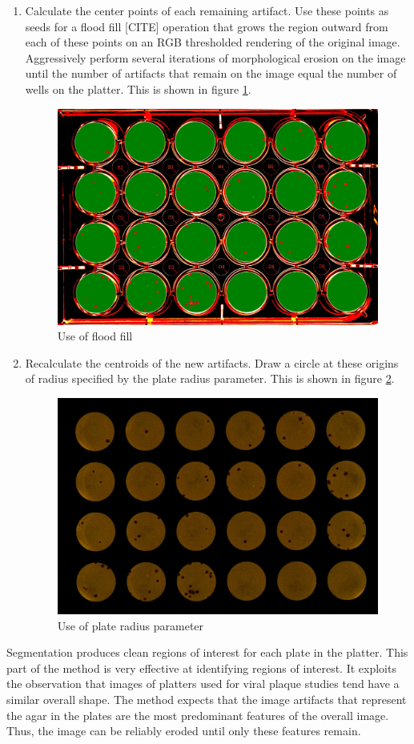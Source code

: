 \documentclass[11pt,final,twocolumn]{IEEEtran}
\begin{document}
\begin{enumerate}
\item
Calculate the center points of each remaining artifact. Use these points as seeds for a flood fill [CITE] operation that grows the region outward from each of these points on an RGB thresholded rendering of the original image.
Aggressively perform several iterations of morphological erosion on the image until the number of artifacts that remain on the image equal the number of wells on the platter. This is shown in figure \ref{fig:segFloodFill}.
\begin{figure}[H]
\centering
\includegraphics[width=.4\textwidth]{segmentFloodFill.jpg}
\caption{Use of flood fill}
\label{fig:segFloodFill}
\end{figure}

\item
Recalculate the centroids of the new artifacts. Draw a circle at these origins of radius specified by the plate radius parameter. This is shown in figure \ref{fig:segUseRadius}.
\begin{figure}[H]
\centering
\includegraphics[width=.4\textwidth]{segmentUseRadius.jpg}
\caption{Use of plate radius parameter}
\label{fig:segUseRadius}
\end{figure}

\end{enumerate}

Segmentation produces clean regions of interest for each plate in the platter. This part of the method is very effective at identifying regions of interest. It exploits the observation that images of platters used for viral plaque studies tend have a similar overall shape. The method expects that the image artifacts that represent the agar in the plates are the most predominant features of the overall image.    Thus, the image can be reliably eroded until only these features remain.  
\end{document}
